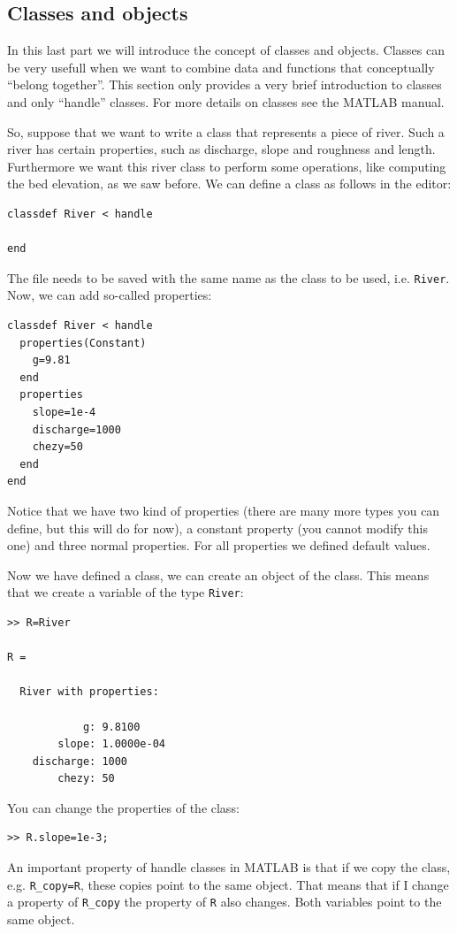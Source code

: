 \documentclass[a4paper]{article}
\begin{document}
\subsection{Classes and objects}
In this last part we will introduce the concept of classes and objects. Classes can be very usefull when we want to combine data and functions that conceptually ``belong together''. This section only provides a very brief introduction to classes and only ``handle'' classes. For more details on classes see the MATLAB manual.

So, suppose that we want to write a class that represents a piece of river. Such a river has certain properties, such as discharge, slope and roughness and length. Furthermore we want this river class to perform some operations, like computing the bed elevation, as we saw before. We can define a class as follows in the editor:
\begin{lstlisting}
classdef River < handle

end
\end{lstlisting}
The file needs to be saved with the same name as the class to be used, i.e. \lstinline{River}. Now, we can add so-called properties:
\begin{lstlisting}
classdef River < handle
  properties(Constant)
    g=9.81
  end
  properties
    slope=1e-4
    discharge=1000
    chezy=50
  end
end
\end{lstlisting}
Notice that we have two kind of properties (there are many more types you can define, but this will do for now), a constant property (you cannot modify this one) and three normal properties. For all properties we defined default values.

Now we have defined a class, we can create an object of the class. This means that we create a variable of the type \lstinline=River=:
\begin{lstlisting}
>> R=River

R =

  River with properties:

            g: 9.8100
        slope: 1.0000e-04
    discharge: 1000
        chezy: 50

\end{lstlisting}
You can change the properties of the class:
\begin{lstlisting}
>> R.slope=1e-3;
\end{lstlisting}
An important property of handle classes in MATLAB is that if we copy the class, e.g. \lstinline|R_copy=R|, these copies point to the same object. That means that if I change a property of \lstinline=R_copy= the property of \lstinline=R= also changes. Both variables point to the same object.
\end{document}
